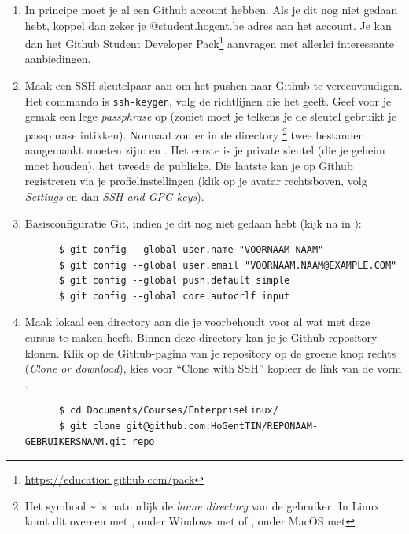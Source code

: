 \begin{enumerate}
  \item In principe moet je al een Github account hebben. Als je dit nog niet gedaan hebt, koppel dan zeker je @student.hogent.be adres aan het account. Je kan dan het Github Student Developer Pack\footnote{\url{https://education.github.com/pack}} aanvragen met allerlei interessante aanbiedingen.
  \item Maak een SSH-sleutelpaar aan om het pushen naar Github te vereenvoudigen. Het commando is \texttt{ssh-keygen}, volg de richtlijnen die het geeft. Geef voor je gemak een lege \emph{passphrase} op (zoniet moet je telkens je de sleutel gebruikt je passphrase intikken). Normaal zou er in de directory \footnote{Het symbool {\textasciitilde} is natuurlijk de \emph{home directory} van de gebruiker. In Linux komt dit overeen met , onder Windows met  of , onder MacOS met } twee bestanden aangemaakt moeten zijn:  en . Het eerste is je private sleutel (die je geheim moet houden), het tweede de publieke. Die laatste kan je op Github registreren via je profielinstellingen (klik op je avatar rechtsboven, volg \emph{Settings} en dan \emph{SSH and GPG keys}).

  \item Basisconfiguratie Git, indien je dit nog niet gedaan hebt (kijk na in ):

    \begin{verbatim}
      $ git config --global user.name "VOORNAAM NAAM"
      $ git config --global user.email "VOORNAAM.NAAM@EXAMPLE.COM"
      $ git config --global push.default simple
      $ git config --global core.autocrlf input
    \end{verbatim}

  \item Maak lokaal een directory aan die je voorbehoudt voor al wat met deze cursus te maken heeft. Binnen deze directory kan je je Github-repository klonen. Klik op de Github-pagina van je repository op de groene knop rechts (\emph{Clone or download}), kies voor ``Clone with SSH'' kopieer de link van de vorm .

    \begin{verbatim}
      $ cd Documents/Courses/EnterpriseLinux/
      $ git clone git@github.com:HoGentTIN/REPONAAM-GEBRUIKERSNAAM.git repo
    \end{verbatim}


\end{enumerate}
